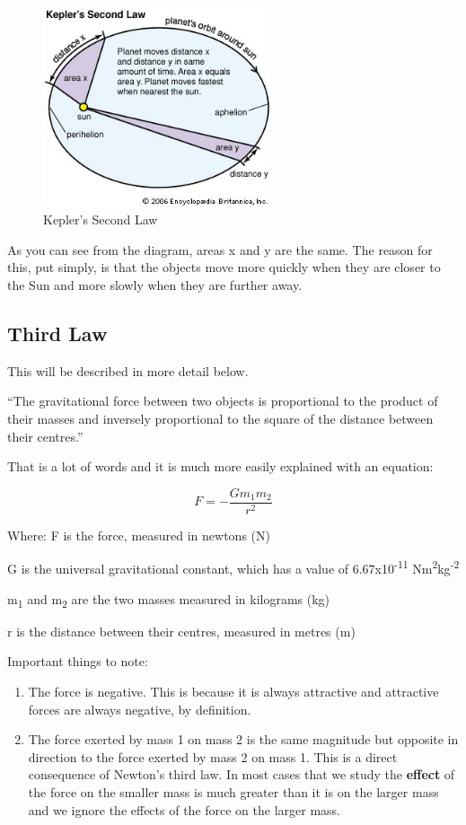 \documentclass[main.tex]{subfiles}
\begin{document}
\begin{figure}[h]
  \includegraphics[width=0.6\textwidth]{figs/chapt-13/image2.jpeg}
  \caption{Kepler's Second Law}
  \label{}
\end{figure}

As you can see from the diagram, areas x and y are the same. The reason
for this, put simply, is that the objects move more quickly when they
are closer to the Sun and more slowly when they are further away.

\subsection{Third Law}

This will be described in more detail below.



``The gravitational force between two objects is proportional to the
product of their masses and inversely proportional to the square of the
distance between their centres.''

That is a lot of words and it is much more easily explained with an
equation:

\[F = - \frac{Gm_{1}m_{2}}{r^{2}}\]

Where: F is the force, measured in newtons (N)

G is the universal gravitational constant, which has a value of
6.67x10\textsuperscript{-11} Nm\textsuperscript{2}kg\textsuperscript{-2}

m\textsubscript{1} and m\textsubscript{2} are the two masses measured in
kilograms (kg)

r is the distance between their centres, measured in metres (m)

Important things to note:

\begin{enumerate}
\def\labelenumi{\arabic{enumi}.}
\item
  The force is negative. This is because it is always attractive and
  attractive forces are always negative, by definition.
\item
  The force exerted by mass 1 on mass 2 is the same magnitude but
  opposite in direction to the force exerted by mass 2 on mass 1. This
  is a direct consequence of Newton's third law. In most cases that we
  study the \textbf{effect} of the force on the smaller mass is much
  greater than it is on the larger mass and we ignore the effects of the
  force on the larger mass.
\end{enumerate}
\end{document}
